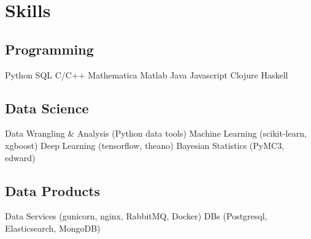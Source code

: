 \documentclass[]{deedy-resume-openfont}
\begin{document}
\begin{minipage}[t]{0.33\textwidth}



\sectionsep
\section{Skills}

\subsection{Programming}
    Python \textbullet{}
    SQL \textbullet{}
    C/C++ \textbullet{}
    Mathematica \textbullet{}
    Matlab \textbullet{}
    Java \textbullet{}
    Javascript \textbullet{}
    Clojure \textbullet{}
    Haskell 

\sectionsep
\subsection{Data Science}
Data Wrangling \& Analysis (Python data tools) \textbullet{}
Machine Learning (scikit-learn, xgboost) \textbullet{}
Deep Learning (tensorflow, theano) \textbullet{}
Bayesian Statistics (PyMC3, edward)
   
\sectionsep
\subsection{Data Products}
Data Services (gunicorn, nginx, RabbitMQ, Docker) \textbullet{}
DBs (Postgresql, Elasticsearch, MongoDB)


%
%

\end{minipage} 
\hfill
\end{document}
